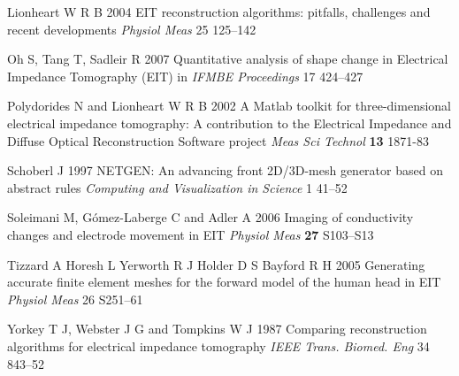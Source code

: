 \documentclass[12pt,draft]{iopart}
\begin{document}
\item[]
Lionheart W R B 2004
EIT reconstruction algorithms: pitfalls, challenges
and recent developments
{\em Physiol Meas}
25 125--142

\item[]
Oh S, Tang T, Sadleir R 2007
Quantitative analysis of shape change in Electrical Impedance Tomography (EIT)
in {\em IFMBE Proceedings}
17 424--427

\item[]
Polydorides N and Lionheart W R B 2002 A Matlab toolkit for
three-dimensional electrical impedance tomography: A contribution
to the Electrical Impedance and Diffuse Optical Reconstruction
Software project {\em Meas Sci Technol} {\bf 13} 1871-83

\item[]
Schoberl J 1997
NETGEN: An advancing front 2D/3D-mesh generator based on abstract rules
{\em Computing and Visualization in Science}
1 41--52 

\item[]
Soleimani M, G\'omez-Laberge C and Adler A 2006 Imaging of
conductivity changes and electrode movement in EIT
{\em Physiol Meas} {\bf 27}
S103--S13

\item[]
Tizzard A Horesh L Yerworth R J Holder D S Bayford R H 2005
Generating accurate finite element meshes for the forward
model of the human head in EIT
{\em Physiol Meas}
 26 S251--61 

\item[]
Yorkey T J, Webster J G and Tompkins W J 1987
Comparing reconstruction algorithms for electrical
impedance tomography
{\em IEEE Trans. Biomed. Eng}
34 843--52


\endrefs
\end{document}
